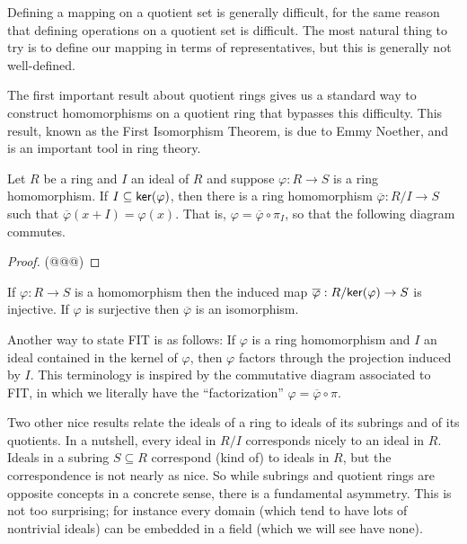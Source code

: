 Defining a mapping on a quotient set is generally difficult, for the same reason that defining operations on a quotient set is difficult.
The most natural thing to try is to define our mapping in terms of representatives, but this is generally not well-defined.

The first important result about quotient rings gives us a standard way to construct homomorphisms on a quotient ring that bypasses this difficulty.
This result, known as the First Isomorphism Theorem, is due to Emmy Noether, and is an important tool in ring theory.

\begin{prop} \label{prop:fit}
Let \(R\) be a ring and \(I\) an ideal of \(R\) and suppose \(\varphi : R \rightarrow S\) is a ring homomorphism.
If \(I \subseteq  \mathsf{ker}(\varphi) \), then there is a ring homomorphism \(\overline{\varphi} : R/I \rightarrow S\) such that \(\overline{\varphi}(x + I) = \varphi(x)\).
That is, \(\varphi = \overline{\varphi} \circ \pi_I\), so that the following diagram commutes.
\begin{center}
\end{center}
\end{prop}

\begin{proof}
(@@@)
\end{proof}

\begin{cor}
If \(\varphi : R \rightarrow S\) is a homomorphism then the induced map \(\overline{\varphi} : R/ \mathsf{ker}(\varphi)  \rightarrow S\) is injective.
If \(\varphi\) is surjective then \(\overline{\varphi}\) is an isomorphism.
\end{cor}

Another way to state FIT is as follows: If \(\varphi\) is a ring homomorphism and \(I\) an ideal contained in the kernel of \(\varphi\), then \(\varphi\) factors through the projection induced by \(I\).
This terminology is inspired by the commutative diagram associated to FIT, in which we literally have the ``factorization'' \(\varphi = \overline{\varphi} \circ \pi\).

Two other nice results relate the ideals of a ring to ideals of its subrings and of its quotients.
In a nutshell, every ideal in \(R/I\) corresponds nicely to an ideal in \(R\).
Ideals in a subring \(S \subseteq R\) correspond (kind of) to ideals in \(R\), but the correspondence is not nearly as nice.
So while subrings and quotient rings are opposite concepts in a concrete sense, there is a fundamental asymmetry.
This is not too surprising; for instance every domain (which tend to have lots of nontrivial ideals) can be embedded in a field (which we will see have none).

